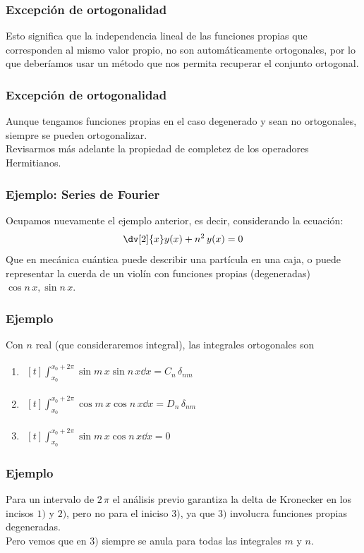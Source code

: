 \begin{frame}
\frametitle{Excepción de ortogonalidad}
Esto significa que la independencia lineal de las funciones propias que corresponden al mismo valor propio, no son automáticamente ortogonales, por lo que deberíamos usar un método que nos permita recuperar el conjunto ortogonal.  
\end{frame}
\begin{frame}
\frametitle{Excepción de ortogonalidad}
Aunque tengamos funciones propias en el caso degenerado y sean no ortogonales, siempre se pueden ortogonalizar.
\\
\bigskip
\pause
Revisarmos más adelante la propiedad de completez de los operadores Hermitianos.
\end{frame}
\begin{frame}
\frametitle{Ejemplo: Series de Fourier}
Ocupamos nuevamente el ejemplo anterior, es decir, considerando la ecuación:
\begin{align*}
\dv[2]{x} y(x) + n^{2} \, y(x) = 0
\end{align*}
Que en mecánica cuántica puede describir una partícula en una caja, o puede representar la cuerda de un violín con funciones propias (degeneradas) $\cos n \, x, \sin n \, x$.
\end{frame}
\begin{frame}
\frametitle{Ejemplo}
Con $n$ real (que consideraremos integral), las integrales ortogonales son
\begin{enumerate}
\item $\begin{aligned}[t] \int_{x_{0}}^{x_{0} + 2 \pi} \sin m \, x \sin n \, x \dd{x} = C_{n} \, \delta_{nm} \end{aligned} $ 
\item $\begin{aligned}[t] \int_{x_{0}}^{x_{0} + 2 \pi} \cos m \, x \cos n \, x \dd{x} = D_{n} \, \delta_{nm} \end{aligned} $ 
\item $\begin{aligned}[t] \int_{x_{0}}^{x_{0} + 2 \pi} \sin m \, x \cos n \, x \dd{x} = 0 \end{aligned} $
\end{enumerate}
\end{frame}
\begin{frame}
\frametitle{Ejemplo}
Para un intervalo de $2 \, \pi$ el análisis previo garantiza la delta de Kronecker en los incisos $1)$ y $2)$, pero no para el iniciso $3)$, ya que $3)$ involucra funciones propias degeneradas.
\\
\bigskip
\pause
Pero vemos que en $3)$ siempre se anula para todas las integrales $m$ y $n$.
\end{frame}
